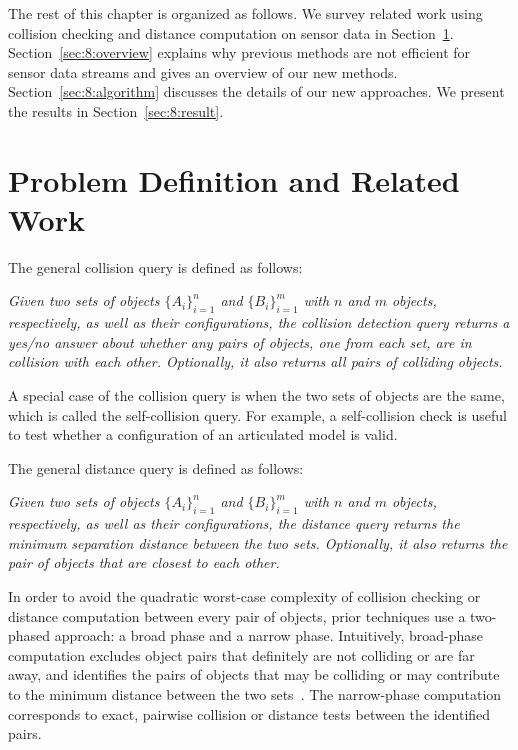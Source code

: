 The rest of this chapter is organized as follows. We survey related work using collision checking and distance computation on sensor data in
Section~\ref{sec:8:related}. Section~\ref{sec:8:overview} explains why
previous methods are not efficient for sensor data streams and gives an
overview of our new methods. Section~\ref{sec:8:algorithm} discusses the
details of our new approaches. We present the results in
Section~\ref{sec:8:result}.


\section{Problem Definition and Related Work}
\label{sec:8:related}

The general collision query is defined as follows:

\emph{Given two sets of objects $\{A_i\}_{i=1}^n$ and
  $\{B_i\}_{i=1}^m$ with $n$ and $m$ objects, respectively, as well as
  their configurations, the collision detection query returns a yes/no
  answer about whether any pairs of objects, one from each set, are in
  collision with each other. Optionally, it also returns all pairs
  of colliding objects.}

A special case of the collision query is when the two sets of objects
are the same, which is called the self-collision query. For example,
a self-collision check is useful to test whether a configuration of an
articulated model is valid.

The general distance query is defined as follows:

\emph{Given two sets of objects $\{A_i\}_{i=1}^n$ and
  $\{B_i\}_{i=1}^m$ with $n$ and $m$ objects, respectively, as well as
  their configurations, the distance query returns the minimum separation distance
  between the two sets. Optionally, it also returns the pair of
  objects that are closest to each other.}

In order to avoid the quadratic worst-case complexity of collision checking or distance computation between every pair of objects, prior
techniques use a two-phased approach: a broad phase and a narrow
phase. Intuitively, broad-phase computation excludes object pairs
that definitely are not colliding or are far away, and identifies
the pairs of objects that may be colliding or may contribute to the
minimum distance between the two
sets~\cite{Eric2004book,Pan:ICRA:2012}. The narrow-phase computation
corresponds to exact, pairwise collision or distance tests between the identified pairs.

